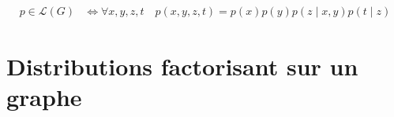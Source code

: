 \documentclass[12pt,a4paper,onecolumn]{article}
\begin{document}
\begin{equation}
	\begin{split}
		p \in \mathcal{L}(G) &\Leftrightarrow \forall x, y, z, t \quad p(x, y, z, t) = p(x)p(y)p(z \mid  x, y) p(t \mid z)
	\end{split}
\end{equation}



\subsection{}


\section{Distributions factorisant sur un graphe}

\subsection{}


\subsection{}
\end{document}
